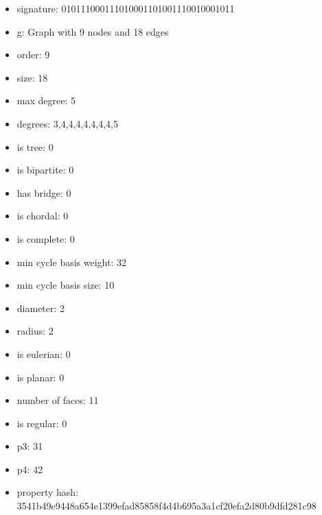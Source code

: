 \newpage
\begin{figure}
\end{figure}
\begin{itemize}
\item signature: 010111000111010001101001110010001011
\item g: Graph with 9 nodes and 18 edges
\item order: 9
\item size: 18
\item max degree: 5
\item degrees: 3,4,4,4,4,4,4,4,5
\item is tree: 0
\item is bipartite: 0
\item has bridge: 0
\item is chordal: 0
\item is complete: 0
\item min cycle basis weight: 32
\item min cycle basis size: 10
\item diameter: 2
\item radius: 2
\item is eulerian: 0
\item is planar: 0
\item number of faces: 11
\item is regular: 0
\item p3: 31
\item p4: 42
\item property hash: 3541b49e9448a654e1399efad85858f4d4b695a3a1cf20efa2d80b9dfd281c98
\end{itemize}
